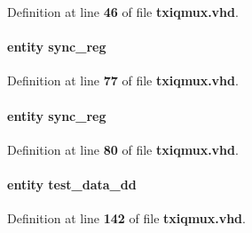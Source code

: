 Definition at line {\bf 46} of file {\bf txiqmux.\+vhd}.

\paragraph[{sync\+\_\+reg0}]{ {\bfseries \textcolor{keywordflow}{entity}\textcolor{vhdlchar}{ }\textcolor{vhdlchar}{sync\+\_\+reg}\textcolor{vhdlchar}{ }} \hspace{0.3cm}{\ttfamily [Instantiation]}}\label{classtxiqmux_1_1arch_a6d0f2de0bd56b397adfb1e48896e42ef}


Definition at line {\bf 77} of file {\bf txiqmux.\+vhd}.

\paragraph[{sync\+\_\+reg1}]{ {\bfseries \textcolor{keywordflow}{entity}\textcolor{vhdlchar}{ }\textcolor{vhdlchar}{sync\+\_\+reg}\textcolor{vhdlchar}{ }} \hspace{0.3cm}{\ttfamily [Instantiation]}}\label{classtxiqmux_1_1arch_a8fc8454c91408892606d3cf049de8638}


Definition at line {\bf 80} of file {\bf txiqmux.\+vhd}.

\paragraph[{test\+\_\+data\+\_\+dd\+\_\+inst1}]{ {\bfseries \textcolor{keywordflow}{entity}\textcolor{vhdlchar}{ }\textcolor{vhdlchar}{test\+\_\+data\+\_\+dd}\textcolor{vhdlchar}{ }} \hspace{0.3cm}{\ttfamily [Instantiation]}}\label{classtxiqmux_1_1arch_addba1d56e4fe902befc1198733e8547b}


Definition at line {\bf 142} of file {\bf txiqmux.\+vhd}.

